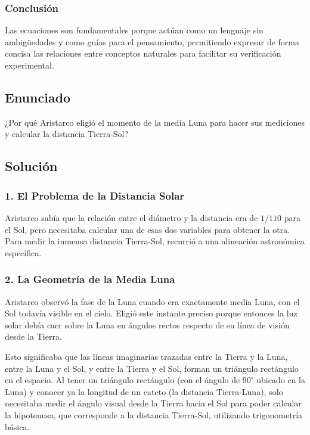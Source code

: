 \documentclass[12pt, a4paper]{article}
\begin{document}
\subsubsection*{Conclusión}
Las ecuaciones son fundamentales porque actúan como un lenguaje sin ambigüedades y como guías para el pensamiento, permitiendo expresar de forma concisa las relaciones entre conceptos naturales para facilitar su verificación experimental.

\newpage

\subsection*{Enunciado}
¿Por qué Aristarco eligió el momento de la media Luna para hacer sus mediciones y calcular la distancia Tierra-Sol?

\subsection*{Solución}

\subsubsection*{1. El Problema de la Distancia Solar}
Aristarco sabía que la relación entre el diámetro y la distancia era de $1/110$ para el Sol, pero necesitaba calcular una de esas dos variables para obtener la otra. Para medir la inmensa distancia Tierra-Sol, recurrió a una alineación astronómica específica.

\subsubsection*{2. La Geometría de la Media Luna}
Aristarco observó la fase de la Luna cuando era exactamente media Luna, con el Sol todavía visible en el cielo. Eligió este instante preciso porque entonces la luz solar debía caer sobre la Luna en ángulos rectos respecto de su línea de visión desde la Tierra.

Esto significaba que las líneas imaginarias trazadas entre la Tierra y la Luna, entre la Luna y el Sol, y entre la Tierra y el Sol, forman un triángulo rectángulo en el espacio. Al tener un triángulo rectángulo (con el ángulo de $90^\circ$ ubicado en la Luna) y conocer ya la longitud de un cateto (la distancia Tierra-Luna), solo necesitaba medir el ángulo visual desde la Tierra hacia el Sol para poder calcular la hipotenusa, que corresponde a la distancia Tierra-Sol, utilizando trigonometría básica.
\end{document}

